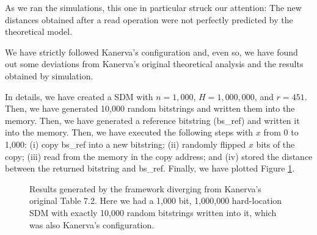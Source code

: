 As we ran the simulations, this one in particular struck our attention: The new distances obtained after a read operation were not perfectly predicted by the theoretical model.

We have strictly followed Kanerva's configuration and, even so, we have found out some deviations from Kanerva's original theoretical analysis and the results obtained by simulation.

In details, we have created a SDM with $n=1,000$, $H=1,000,000$, and $r=451$. Then, we have generated 10,000 random bitstrings and written them into the memory. Then, we have generated a reference bitstring (bs\_ref) and written it into the memory. Then, we have executed the following steps with $x$ from 0 to 1,000: (i) copy bs\_ref into a new bitstring; (ii) randomly flipped $x$ bits of the copy; (iii) read from the memory in the copy address; and (iv) stored the distance between the returned bitstring and bs\_ref. Finally, we have plotted Figure \ref{fig:sdm-10000w-table-7-2}.

\begin{figure}[h]
\centering
{}

\caption{Results generated by the framework diverging from Kanerva's original Table 7.2. Here we had a 1,000 bit, 1,000,000 hard-location SDM with exactly 10,000 random bitstrings written into it, which was also Kanerva's configuration.
\label{fig:sdm-10000w-table-7-2}}
\end{figure}

